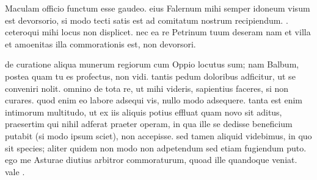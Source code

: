 


 Maculam officio functum esse gaudeo. eius Falernum mihi semper idoneum visum est devorsorio, si modo tecti satis est ad comitatum nostrum recipiendum. . ceteroqui mihi locus non displicet. nec ea re Petrinum tuum deseram nam et villa et amoenitas illa commorationis est, non devorsori.

 de curatione aliqua munerum regiorum cum Oppio locutus sum; nam Balbum, postea quam tu es profectus, non vidi. tantis pedum doloribus adficitur, ut se conveniri nolit. omnino de tota re, ut mihi videris, sapientius faceres, si non curares. quod enim eo labore adsequi vis, nullo modo adsequere. tanta est enim intimorum multitudo, ut ex iis aliquis potius effluat quam novo sit aditus, praesertim qui nihil adferat praeter operam, in qua ille se dedisse beneficium putabit (si modo ipsum sciet), non accepisse. sed tamen aliquid videbimus, in quo sit species; aliter quidem non modo non adpetendum sed etiam fugiendum puto. ego me Asturae diutius arbitror commoraturum, quoad ille quandoque veniat. vale .
